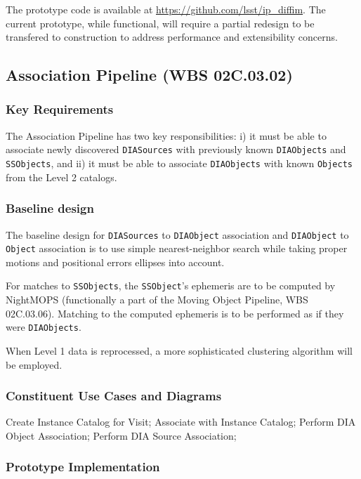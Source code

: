 \documentclass[12pt]{article}
\newcommand{\code}[1]{\texttt{#1}}
\newcommand{\DIASources}{\code{DIASources}\xspace}
\newcommand{\DIAObject}{\code{DIAObject}\xspace}
\newcommand{\DIAObjects}{\code{DIAObjects}\xspace}
\newcommand{\Object}{\code{Object}\xspace}
\newcommand{\Objects}{\code{Objects}\xspace}
\newcommand{\SSObject}{\code{SSObject}\xspace}
\newcommand{\SSObjects}{\code{SSObjects}\xspace}
\newcommand{\wbsAssocP}{WBS 02C.03.02}
\newcommand{\wbsMOPS}{WBS 02C.03.06}
\begin{document}
The prototype code is available at \url{https://github.com/lsst/ip_diffim}. The current prototype, while functional, will require a partial redesign to be transfered to construction to address performance and extensibility concerns.

\clearpage

\subsection{Association Pipeline (\wbsAssocP)}

\subsubsection{Key Requirements}

The Association Pipeline has two key responsibilities: i) it must be able to associate newly discovered \DIASources with previously known \DIAObjects and \SSObjects, and ii) it must be able to associate \DIAObjects with known \Objects from the Level 2 catalogs.

\subsubsection{Baseline design}

The baseline design for \DIASources to \DIAObject association and \DIAObject to \Object association is to use simple nearest-neighbor search while taking proper motions and positional errors ellipses into account.

For matches to \SSObjects, the \SSObject's ephemeris are to be computed by NightMOPS (functionally a part of the Moving Object Pipeline, \wbsMOPS). Matching to the computed ephemeris is to be performed as if they were \DIAObjects.

When Level 1 data is reprocessed, a more sophisticated clustering algorithm \cite{Ankerst99} will be employed.

\subsubsection{Constituent Use Cases and Diagrams}

Create Instance Catalog for Visit; Associate with Instance Catalog;
Perform DIA Object Association; Perform DIA Source Association;

\subsubsection{Prototype Implementation}
\end{document}
